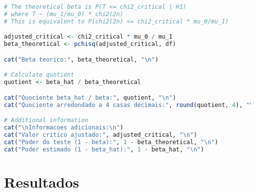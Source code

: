 \documentclass[11pt,a4paper]{article}
\begin{document}
\begin{lstlisting}[language=R]
# The theoretical beta is P(T <= chi2_critical | H1)
# where T ~ (mu_1/mu_0) * chi2(2n)
# This is equivalent to P(chi2(2n) <= chi2_critical * mu_0/mu_1)

adjusted_critical <- chi2_critical * mu_0 / mu_1
beta_theoretical <- pchisq(adjusted_critical, df)

cat("Beta teorico:", beta_theoretical, "\n")

# Calculate quotient
quotient <- beta_hat / beta_theoretical

cat("Quociente beta_hat / beta:", quotient, "\n")
cat("Quociente arredondado a 4 casas decimais:", round(quotient, 4), "\n")

# Additional information
cat("\nInformacoes adicionais:\n")
cat("Valor critico ajustado:", adjusted_critical, "\n")
cat("Poder do teste (1 - beta):", 1 - beta_theoretical, "\n")
cat("Poder estimado (1 - beta_hat):", 1 - beta_hat, "\n")
\end{lstlisting}

\section*{Resultados}
\end{document}

